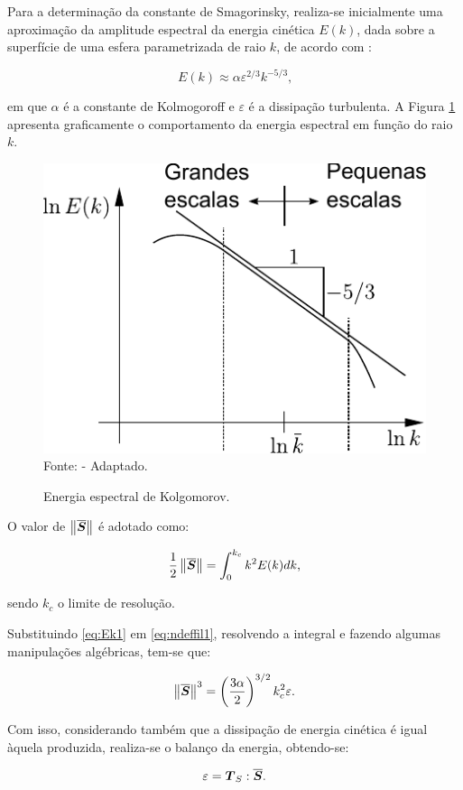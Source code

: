 Para a determinação da constante de Smagorinsky, realiza-se inicialmente uma aproximação da amplitude espectral da energia cinética $E(k)$, dada sobre a superfície de uma esfera parametrizada de raio $k$, de acordo com \cite{hughes2000large}:

\begin{equation}
    E(k)\approx\alpha\varepsilon^{2/3}k^{-5/3}\text{,}\label{eq:Ek1}
\end{equation}

\noindent em que $\alpha$ é a constante de Kolmogoroff e $\varepsilon$ é a dissipação turbulenta. A Figura \ref{fig:EnergiaEspectral} apresenta graficamente o comportamento da energia espectral em função do raio $k$.

\begin{figure}[h!]
    \centering
    \caption{Energia espectral de Kolgomorov.}
    \includegraphics[width=0.4\linewidth]{Figuras/EnergiaEspectral.pdf}
    \\Fonte: \cite{hughes2000large} - Adaptado.
    \label{fig:EnergiaEspectral}
\end{figure}

O valor de $\left\lVert{\overline{\boldsymbol{S}}}\right\lVert$ é adotado como:

\begin{equation}
    \frac{1}{2}\left\lVert{\overline{\boldsymbol{S}}}\right\lVert=\int_0^{k_c}{k^2E(k)dk}\text{,}\label{eq:ndeffil1}
\end{equation}

\noindent sendo $k_c$ o limite de resolução.

Substituindo \eqref{eq:Ek1} em \eqref{eq:ndeffil1}, resolvendo a integral e fazendo algumas manipulações algébricas, tem-se que:

\begin{equation}
    \left\lVert{\overline{\boldsymbol{S}}}\right\lVert^3=\left({\frac{3\alpha}{2}}\right)^{3/2}k_c^2\varepsilon\text{.}
\end{equation}

Com isso, considerando também que a dissipação de energia cinética é igual àquela produzida, realiza-se o balanço da energia, obtendo-se:

\begin{equation}
    \varepsilon=\boldsymbol{T}_S:\overline{\boldsymbol{S}}\text{.}
\end{equation}

